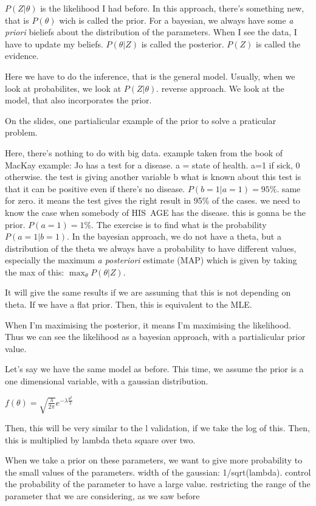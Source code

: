 \documentclass[a4paper]{tufte-book}
\begin{document}
$P(Z|\theta)$ is the likelihood I had before.
In this approach, there's something new, that is $P(\theta)$ wich is called the prior.
For a bayesian, we always have some \emph{a priori} bieliefs about the
distribution of the parameters. When I see the data, I have to update my
beliefs.
$P(\theta|Z)$ is called the posterior.
$P(Z)$ is called the evidence.

Here we have to do the inference, that is the general model. Usually, when we
look at probabilites, we look at $P(Z|\theta)$. reverse approach.
We look at  the model, that also incorporates the prior.

On the slides, one partialicular example of the prior to solve a praticular problem.


Here, there's nothing to do with big data. example taken from the book of MacKay
example: Jo has a test for a disease. a = state of health.
a=1 if sick, 0 otherwise.
the test is giving another variable b
what is known about this test is that it can be positive even if there's no
disease. $P(b=1|a=1) = 95\%$. same for zero.
it means the test gives the right result in 95\% of the cases.
we need to know the case when somebody of HIS AGE has the disease. this
is gonna be the prior. $P(a=1) = 1\%$.
The exercise is to find what is the probability $P(a=1|b=1)$.
In the bayesian approach, we do not have a theta, but a distribution of the theta
we always have a probability to have different values, especially the maximum
\emph{a posteriori} estimate (MAP)
which is given by taking the max of this:
$\max_\theta P(\theta|Z)$.

It will give the same results if we are assuming that this is not depending on theta. If we have a flat prior.
Then, this is equivalent to the MLE.

When I'm maximising the posterior, it means I'm maximising the likelihood.
Thus we can see the likelihood as a bayesian approach, with a partialicular prior
value.

Let's say we have the same model as before. This time, we assume the prior is
a one dimensional variable, with a gaussian distribution.

$f(\theta)  = \sqrt{\frac{\lambda}{2\pi}} e^{-\lambda \frac{\theta^2}{2}}$

Then, this will be very similar to the l validation, if we take the log of this.
Then, this is multiplied by lambda theta square over two.

When we take a prior on these parameters, we want to give more probability to
the small values of the parameters. width of the gaussian: 1/sqrt(lambda).
control the probability of the parameter to have a large value.
restricting the range of the parameter that we are considering, as we saw before
\end{document}
